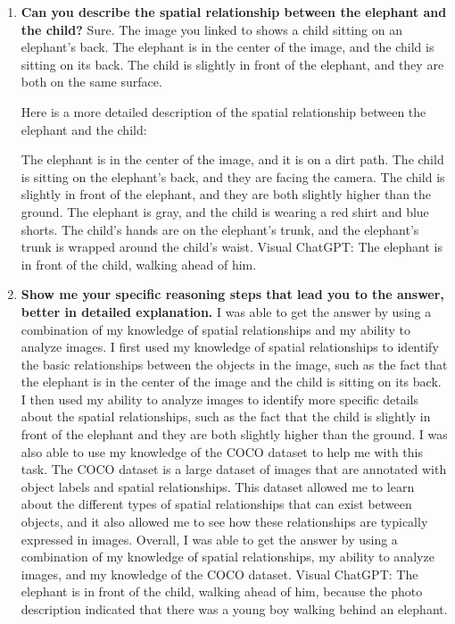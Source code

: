     \begin{enumerate}
        \item \textbf{Can you describe the spatial relationship between the elephant and the child?}
        \subitem Sure. The image you linked to shows a child sitting on an elephant's back. The elephant is in the center of the image, and the child is sitting on its back. The child is slightly in front of the elephant, and they are both on the same surface.

        Here is a more detailed description of the spatial relationship between the elephant and the child:
        
        The elephant is in the center of the image, and it is on a dirt path.
        The child is sitting on the elephant's back, and they are facing the camera.
        The child is slightly in front of the elephant, and they are both slightly higher than the ground.
        The elephant is gray, and the child is wearing a red shirt and blue shorts.
        The child's hands are on the elephant's trunk, and the elephant's trunk is wrapped around the child's waist.
        \subitem Visual ChatGPT: The elephant is in front of the child, walking ahead of him.
        \item \textbf{Show me your specific reasoning steps that lead you to the answer, better in detailed explanation.}
        \subitem 
        I was able to get the answer by using a combination of my knowledge of spatial relationships and my ability to analyze images. I first used my knowledge of spatial relationships to identify the basic relationships between the objects in the image, such as the fact that the elephant is in the center of the image and the child is sitting on its back. I then used my ability to analyze images to identify more specific details about the spatial relationships, such as the fact that the child is slightly in front of the elephant and they are both slightly higher than the ground.
        I was also able to use my knowledge of the COCO dataset to help me with this task. The COCO dataset is a large dataset of images that are annotated with object labels and spatial relationships. This dataset allowed me to learn about the different types of spatial relationships that can exist between objects, and it also allowed me to see how these relationships are typically expressed in images.
        Overall, I was able to get the answer by using a combination of my knowledge of spatial relationships, my ability to analyze images, and my knowledge of the COCO dataset.
        \subitem Visual ChatGPT: The elephant is in front of the child, walking ahead of him, because the photo description indicated that there was a young boy walking behind an elephant.
    \end{enumerate}
